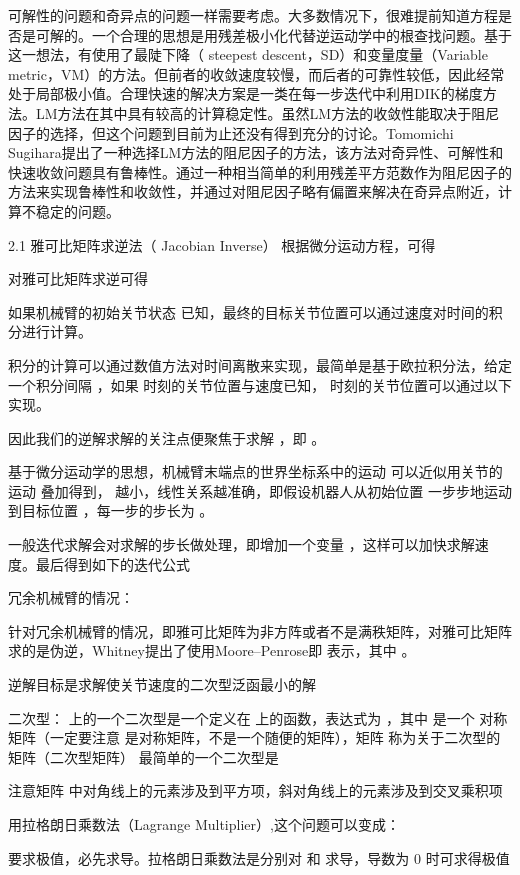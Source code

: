 可解性的问题和奇异点的问题一样需要考虑。大多数情况下，很难提前知道方程是否是可解的。一个合理的思想是用残差极小化代替逆运动学中的根查找问题。基于这一想法，有使用了最陡下降（ steepest descent，SD）和变量度量（Variable metric，VM）的方法。但前者的收敛速度较慢，而后者的可靠性较低，因此经常处于局部极小值。合理快速的解决方案是一类在每一步迭代中利用DIK的梯度方法。LM方法在其中具有较高的计算稳定性。虽然LM方法的收敛性能取决于阻尼因子的选择，但这个问题到目前为止还没有得到充分的讨论。Tomomichi Sugihara提出了一种选择LM方法的阻尼因子的方法，该方法对奇异性、可解性和快速收敛问题具有鲁棒性。通过一种相当简单的利用残差平方范数作为阻尼因子的方法来实现鲁棒性和收敛性，并通过对阻尼因子略有偏置来解决在奇异点附近，计算不稳定的问题。



2.1 雅可比矩阵求逆法（ Jacobian Inverse）
根据微分运动方程，可得

对雅可比矩阵求逆可得


如果机械臂的初始关节状态 
 已知，最终的目标关节位置可以通过速度对时间的积分进行计算。

积分的计算可以通过数值方法对时间离散来实现，最简单是基于欧拉积分法，给定一个积分间隔 
 ，如果 
 时刻的关节位置与速度已知， 
 时刻的关节位置可以通过以下实现。

因此我们的逆解求解的关注点便聚焦于求解 
，即 
 。



基于微分运动学的思想，机械臂末端点的世界坐标系中的运动 
 可以近似用关节的运动 
 叠加得到，
 越小，线性关系越准确，即假设机器人从初始位置 
 一步步地运动到目标位置 
，每一步的步长为 
 。

一般迭代求解会对求解的步长做处理，即增加一个变量
，这样可以加快求解速度。最后得到如下的迭代公式


冗余机械臂的情况：

针对冗余机械臂的情况，即雅可比矩阵为非方阵或者不是满秩矩阵，对雅可比矩阵求的是伪逆，Whitney提出了使用Moore–Penrose即 
 表示，其中
。

逆解目标是求解使关节速度的二次型泛函最小的解

二次型： 
 上的一个二次型是一个定义在 
 上的函数，表达式为 
 ，其中 
 是一个 
 对称矩阵（一定要注意 
 是对称矩阵，不是一个随便的矩阵），矩阵 
 称为关于二次型的矩阵（二次型矩阵）
最简单的一个二次型是 

注意矩阵 
 中对角线上的元素涉及到平方项，斜对角线上的元素涉及到交叉乘积项


用拉格朗日乘数法（Lagrange Multiplier）,这个问题可以变成：

要求极值，必先求导。拉格朗日乘数法是分别对 
 和 
 求导，导数为 0 时可求得极值


